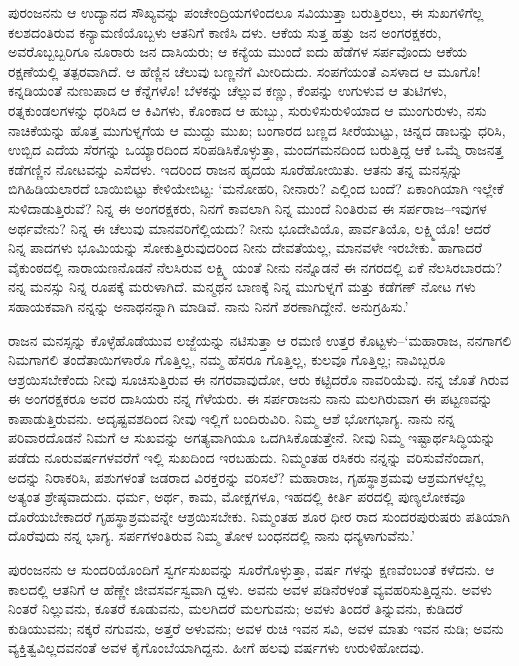 ಪುರಂಜನನು ಆ ಉದ್ಯಾನದ ಸೌಖ್ಯವನ್ನು ಪಂಚೇಂದ್ರಿಯಗಳಿಂದಲೂ ಸವಿಯುತ್ತಾ ಬರುತ್ತಿರಲು, ಈ ಸುಖಗಳಿಗೆಲ್ಲ ಕಲಶದಂತಿರುವ ಕನ್ಯಾಮಣಿಯೊಬ್ಬಳು ಆತನಿಗೆ ಕಾಣಿಸಿ ದಳು. ಆಕೆಯ ಸುತ್ತ ಹತ್ತು ಜನ ಅಂಗರಕ್ಷಕರು, ಅವರೊಬ್ಬಬ್ಬರಿಗೂ ನೂರಾರು ಜನ ದಾಸಿಯರು; ಆ ಕನ್ಯೆಯ ಮುಂದೆ ಐದು ಹೆಡೆಗಳ ಸರ್ಪವೊಂದು ಆಕೆಯ ರಕ್ಷಣೆಯಲ್ಲಿ ತತ್ಪರವಾಗಿದೆ. ಆ ಹೆಣ್ಣಿನ ಚೆಲುವು ಬಣ್ಣನೆಗೆ ಮೀರಿದುದು. ಸಂಪಗೆಯಂತೆ ಎಸಳಾದ ಆ ಮೂಗೊ! ಕನ್ನಡಿಯಂತೆ ನುಣುಪಾದ ಆ ಕೆನ್ನೆಗಳೊ! ಬೆಳಕನ್ನು ಚೆಲ್ಲುವ ಕಣ್ಣು, ಕೆಂಪನ್ನು ಉಗುಳುವ ಆ ತುಟಿಗಳು, ರತ್ನಕುಂಡಲಗಳನ್ನು ಧರಿಸಿದ ಆ ಕಿವಿಗಳು, ಕೊಂಕಾದ ಆ ಹುಬ್ಬು, ಸುರುಳಿಸುರುಳಿಯಾದ ಆ ಮುಂಗುರುಳು, ನಸು ನಾಚಿಕೆಯನ್ನು ಹೊತ್ತ ಮುಗುಳ್ನಗೆಯ ಆ ಮುದ್ದು ಮುಖ; ಬಂಗಾರದ ಬಣ್ಣದ ಸೀರೆಯುಟ್ಟು, ಚಿನ್ನದ ಡಾಬನ್ನು ಧರಿಸಿ, ಉಬ್ಬಿದ ಎದೆಯ ಸೆರಗನ್ನು ಒಯ್ಯಾರದಿಂದ ಸರಿಪಡಿಸಿಕೊಳ್ಳುತ್ತಾ, ಮಂದಗಮನದಿಂದ ಬರುತ್ತಿದ್ದ ಆಕೆ ಒಮ್ಮೆ ರಾಜನತ್ತ ಕಡೆಗಣ್ಣಿನ ನೋಟವನ್ನು ಎಸೆದಳು. ಇದರಿಂದ ರಾಜನ ಹೃದಯ ಸೂರೆಹೋಯಿತು. ಆತನು ತನ್ನ ಮನಸ್ಸನ್ನು ಬಿಗಿಹಿಡಿಯಲಾರದೆ ಬಾಯಿಬಿಟ್ಟು ಕೇಳಿಯೇಬಿಟ್ಟ: ‘ಮನೋಹರಿ, ನೀನಾರು? ಎಲ್ಲಿಂದ ಬಂದೆ? ಏಕಾಂಗಿಯಾಗಿ ಇಲ್ಲೇಕೆ ಸುಳಿದಾಡುತ್ತಿರುವೆ? ನಿನ್ನ ಈ ಅಂಗರಕ್ಷಕರು, ನಿನಗೆ ಕಾವಲಾಗಿ ನಿನ್ನ ಮುಂದೆ ನಿಂತಿರುವ ಈ ಸರ್ಪರಾಜ–ಇವುಗಳ ಅರ್ಥವೇನು? ನಿನ್ನ ಈ ಚೆಲುವು ಮಾನವರಿಗೆಲ್ಲಿಯದು? ನೀನು ಭೂದೇವಿಯೊ, ಪಾರ್ವತಿಯೊ, ಲಕ್ಷ್ಮಿಯೊ! ಆದರೆ ನಿನ್ನ ಪಾದಗಳು ಭೂಮಿಯನ್ನು ಸೋಕುತ್ತಿರುವುದರಿಂದ ನೀನು ದೇವತೆಯಲ್ಲ, ಮಾನವಳೇ ಇರಬೇಕು. ಹಾಗಾದರೆ ವೈಕುಂಠದಲ್ಲಿ ನಾರಾಯಣನೊಡನೆ ನೆಲಸಿರುವ ಲಕ್ಷ್ಮಿ ಯಂತೆ ನೀನು ನನ್ನೊಡನೆ ಈ ನಗರದಲ್ಲಿ ಏಕೆ ನೆಲಸಿರಬಾರದು? ನನ್ನ ಮನಸ್ಸು ನಿನ್ನ ರೂಪಕ್ಕೆ ಮರುಳಾಗಿದೆ. ಮನ್ಮಥನ ಬಾಣಕ್ಕೆ ನಿನ್ನ ಮುಗುಳ್ನಗೆ ಮತ್ತು ಕಡೆಗಣ್ ನೋಟ ಗಳು ಸಹಾಯಕವಾಗಿ ನನ್ನನ್ನು ಅನಾಥನನ್ನಾಗಿ ಮಾಡಿವೆ. ನಾನು ನಿನಗೆ ಶರಣಾಗಿದ್ದೇನೆ. ಅನುಗ್ರಹಿಸು.’

ರಾಜನ ಮನಸ್ಸನ್ನು ಕೊಳ್ಳೆಹೊಡೆಯುವ ಲಜ್ಜೆಯನ್ನು ನಟಿಸುತ್ತಾ ಆ ರಮಣಿ ಉತ್ತರ ಕೊಟ್ಟಳು–‘ಮಹಾರಾಜ, ನನಗಾಗಲಿ ನಿಮಗಾಗಲಿ ತಂದೆತಾಯಿಗಳಾರೊ ಗೊತ್ತಿಲ್ಲ, ನಮ್ಮ ಹೆಸರೂ ಗೊತ್ತಿಲ್ಲ, ಕುಲವೂ ಗೊತ್ತಿಲ್ಲ; ನಾವಿಬ್ಬರೂ ಆಶ್ರಯಿಸಬೇಕೆಂದು ನೀವು ಸೂಚಿಸುತ್ತಿರುವ ಈ ನಗರವಾವುದೋ, ಆರು ಕಟ್ಟಿದರೊ ನಾವರಿಯೆವು. ನನ್ನ ಜೊತೆ ಗಿರುವ ಈ ಅಂಗರಕ್ಷಕರೂ ಅವರ ದಾಸಿಯರು ನನ್ನ ಗೆಳೆಯರು. ಈ ಸರ್ಪರಾಜನು ನಾನು ಮಲಗಿರುವಾಗ ಈ ಪಟ್ಟಣವನ್ನು ಕಾಪಾಡುತ್ತಿರುವನು. ಅದೃಷ್ಟವಶದಿಂದ ನೀವು ಇಲ್ಲಿಗೆ ಬಂದಿರುವಿರಿ. ನಿಮ್ಮ ಆಶೆ ಭೋಗಭಾಗ್ಯ. ನಾನು ನನ್ನ ಪರಿವಾರದೊಡನೆ ನಿಮಗೆ ಆ ಸುಖವನ್ನು ಅಗತ್ಯವಾಗಿಯೂ ಒದಗಿಸಿಕೊಡುತ್ತೇನೆ. ನೀವು ನಿಮ್ಮ ಇಷ್ಟಾರ್ಥಸಿದ್ಧಿಯನ್ನು ಪಡೆದು ನೂರುವರ್ಷಗಳವರೆಗೆ ಇಲ್ಲಿ ಸುಖದಿಂದ ಇರಬಹುದು. ನಿಮ್ಮಂತಹ ರಸಿಕರು ನನ್ನನ್ನು ವರಿಸುವೆನೆಂದಾಗ, ಅದನ್ನು ನಿರಾಕರಿಸಿ, ಪಶುಗಳಂತೆ ಜಡರಾದ ವಿರಕ್ತರನ್ನು ವರಿಸಲೆ? ಮಹಾರಾಜ, ಗೃಹಸ್ಥಾಶ್ರಮವು ಆಶ್ರಮಗಳಲ್ಲೆಲ್ಲ ಅತ್ಯಂತ ಶ್ರೇಷ್ಠವಾದುದು. ಧರ್ಮ, ಅರ್ಥ, ಕಾಮ, ಮೋಕ್ಷಗಳೂ, ಇಹದಲ್ಲಿ ಕೀರ್ತಿ ಪರದಲ್ಲಿ ಪುಣ್ಯಲೋಕವೂ ದೊರೆಯಬೇಕಾದರೆ ಗೃಹಸ್ಥಾಶ್ರಮವನ್ನೇ ಆಶ್ರಯಿಸಬೇಕು. ನಿಮ್ಮಂತಹ ಶೂರ ಧೀರ ರಾದ ಸುಂದರಪುರುಷರು ಪತಿಯಾಗಿ ದೊರೆವುದು ನನ್ನ ಭಾಗ್ಯ. ಸರ್ಪಗಳಂತಿರುವ ನಿಮ್ಮ ತೋಳ ಬಂಧನದಲ್ಲಿ ನಾನು ಧನ್ಯಳಾಗುವೆನು.’

ಪುರಂಜನನು ಆ ಸುಂದರಿಯೊಂದಿಗೆ ಸ್ವರ್ಗಸುಖವನ್ನು ಸೂರೆಗೊಳ್ಳುತ್ತಾ, ವರ್ಷ ಗಳನ್ನು ಕ್ಷಣವೆಂಬಂತೆ ಕಳೆದನು. ಆ ಕಾಲದಲ್ಲಿ ಆತನಿಗೆ ಆ ಹೆಣ್ಣೇ ಜೀವಸರ್ವಸ್ವವಾಗಿ ದ್ದಳು. ಅವನು ಅವಳ ಪಡಿನೆರಳಂತೆ ವ್ಯವಹರಿಸುತ್ತಿದ್ದನು. ಅವಳು ನಿಂತರೆ ನಿಲ್ಲುವನು, ಕೂತರೆ ಕೂಡುವನು, ಮಲಗಿದರೆ ಮಲಗುವನು; ಅವಳು ತಿಂದರೆ ತಿನ್ನುವನು, ಕುಡಿದರೆ ಕುಡಿಯುವನು; ನಕ್ಕರೆ ನಗುವನು, ಅತ್ತರೆ ಅಳುವನು; ಅವಳ ರುಚಿ ಇವನ ಸವಿ, ಅವಳ ಮಾತು ಇವನ ನುಡಿ; ಅವನು ವ್ಯಕ್ತಿತ್ವವಿಲ್ಲದವನಂತೆ ಅವಳ ಕೈಗೊಂಬೆಯಾಗಿದ್ದನು. ಹೀಗೆ ಹಲವು ವರ್ಷಗಳು ಉರುಳಿಹೋದವು.

